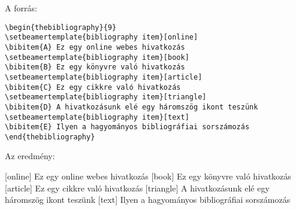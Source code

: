 \documentclass{beamer}
\begin{document}
\begin{frame}[fragile]
A forrás:	
\begin{verbatim}
\begin{thebibliography}{9}	
\setbeamertemplate{bibliography item}[online]
\bibitem{A} Ez egy online webes hivatkozás
\setbeamertemplate{bibliography item}[book]
\bibitem{B} Ez egy könyvre való hivatkozás
\setbeamertemplate{bibliography item}[article]
\bibitem{C} Ez egy cikkre való hivatkozás
\setbeamertemplate{bibliography item}[triangle]
\bibitem{D} A hivatkozásunk elé egy háromszög ikont teszünk
\setbeamertemplate{bibliography item}[text]
\bibitem{E} Ilyen a hagyományos bibliográfiai sorszámozás
\end{thebibliography}
\end{verbatim}
\end{frame}
\begin{frame}
	Az eredmény:
	\begin{thebibliography}{9}
		[online]
		 Ez egy online webes hivatkozás
		 Ez egy könyvre való hivatkozás
		[article]
		 Ez egy cikkre való hivatkozás
		[triangle]
		 A hivatkozásunk elé egy háromszög ikont teszünk
		 Ilyen a hagyományos bibliográfiai sorszámozás
	\end{thebibliography}
\end{frame}
\end{document}

